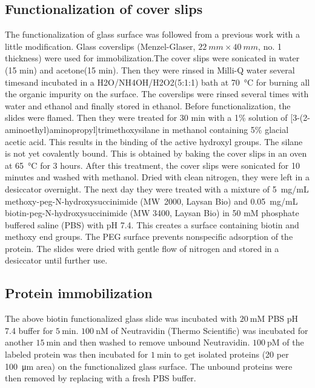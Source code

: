 \subsection{Functionalization of cover slips}
The functionalization of glass surface was followed from a previous work with a little modification.\cite{gupta2012involvement} Glass coverslips (Menzel-Glaser, $22~mm \times 40~mm$, no. 1 thickness) were used for immobilization.The cover slips were sonicated in water (15 min) and acetone(15 min). Then they were rinsed in Milli-Q water several timesand incubated in a H2O/NH4OH/H2O2(5:1:1) bath at \SI{70}{\celsius} for burning all the organic impurity on the surface. The coverslips were rinsed several times with water and ethanol and finally stored in ethanol. Before functionalization, the slides were flamed. Then they were treated for 30 min with a 1\% solution of [3-(2-aminoethyl)aminopropyl]trimethoxysilane in methanol containing 5\% glacial acetic acid. This results in the binding of the active hydroxyl groups. The silane is not yet covalently bound. This is obtained by baking the cover slips in an oven at \SI{65}{\celsius} for 3 hours. After this treatment, the cover slips were sonicated for 10 minutes and washed with methanol. Dried with clean nitrogen, they were left in a desiccator overnight. The next day they were treated with a mixture of 5~mg/mL methoxy-peg-N-hydroxysuccinimide (MW~2000, Laysan Bio) and 0.05~mg/mL
biotin-peg-N-hydroxysuccinimide (MW 3400, Laysan Bio) in 50 mM phosphate buffered saline (PBS) with pH 7.4. This creates a surface containing biotin and methoxy end groups. The PEG surface prevents nonspecific adsorption of the protein. The slides were dried with gentle flow of nitrogen and stored in a desiccator until further use.
\subsection{Protein immobilization}
The above biotin functionalized glass slide was incubated with $20~$mM PBS pH 7.4 buffer for $5~$min. $100~$nM of Neutravidin (Thermo Scientific) was incubated for another $15~$min and then washed to remove unbound Neutravidin. $100~$pM of the labeled protein was then incubated for $1~$min to get isolated proteins (20 per \SI{100}{\micro\meter} area) on the functionalized glass surface. The unbound proteins were then removed by replacing with a fresh PBS buffer.
